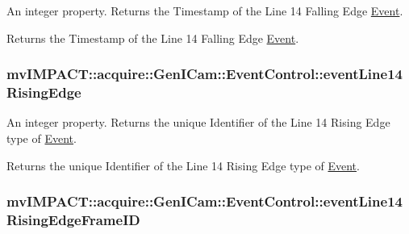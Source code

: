 An integer property. Returns the Timestamp of the Line 14 Falling Edge \hyperlink{classmv_i_m_p_a_c_t_1_1acquire_1_1_event}{Event}. 

Returns the Timestamp of the Line 14 Falling Edge \hyperlink{classmv_i_m_p_a_c_t_1_1acquire_1_1_event}{Event}. \hypertarget{classmv_i_m_p_a_c_t_1_1acquire_1_1_gen_i_cam_1_1_event_control_a3ff784b1574c6618ba494109f47ce142}{
\subsubsection[{event\+Line14\+Rising\+Edge}]{ mv\+I\+M\+P\+A\+C\+T\+::acquire\+::\+Gen\+I\+Cam\+::\+Event\+Control\+::event\+Line14\+Rising\+Edge}}\label{classmv_i_m_p_a_c_t_1_1acquire_1_1_gen_i_cam_1_1_event_control_a3ff784b1574c6618ba494109f47ce142}


An integer property. Returns the unique Identifier of the Line 14 Rising Edge type of \hyperlink{classmv_i_m_p_a_c_t_1_1acquire_1_1_event}{Event}. 

Returns the unique Identifier of the Line 14 Rising Edge type of \hyperlink{classmv_i_m_p_a_c_t_1_1acquire_1_1_event}{Event}. \hypertarget{classmv_i_m_p_a_c_t_1_1acquire_1_1_gen_i_cam_1_1_event_control_a82c16a3a38365df036f1afc04b0bd036}{
\subsubsection[{event\+Line14\+Rising\+Edge\+Frame\+I\+D}]{ mv\+I\+M\+P\+A\+C\+T\+::acquire\+::\+Gen\+I\+Cam\+::\+Event\+Control\+::event\+Line14\+Rising\+Edge\+Frame\+I\+D}}\label{classmv_i_m_p_a_c_t_1_1acquire_1_1_gen_i_cam_1_1_event_control_a82c16a3a38365df036f1afc04b0bd036}



